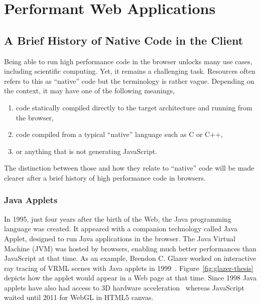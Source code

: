 \chapter{Performant Web Applications}%
\label{cha:performant_web_applications}

\minitoc%

\section{A Brief History of Native Code in the Client}%
\label{sec:native_client}

Being able to run high performance code in the browser
unlocks many use cases, including scientific computing.
Yet, it remains a challenging task.
Resources often refers to this as ``native'' code
but the terminology is rather vague.
Depending on the context, it may have one of the following meanings,
\begin{enumerate}
\setlength\itemsep{-0.5em}
	\item code statically compiled directly to the target architecture and running from the browser,
	\item code compiled from a typical ``native'' language such as C or C++,
	\item or anything that is not generating JavaScript.
\end{enumerate}
The distinction between those and how they relate to ``native'' code
will be made clearer after a brief history of high performance code in browsers.

\subsection{Java Applets}%
\label{sub:java_applets}

In 1995, just four years after the birth of the Web,
the Java programming language was created.
It appeared with a companion technology called Java Applet,
designed to run Java applications in the browser.
The Java Virtual Machine (JVM) was hosted by browsers,
enabling much better performances than JavaScript at that time.
As an example, Brendon C. Glazer worked on interactive ray tracing
of VRML scenes with Java applets in 1999~\cite{Glazer1999InteractiveRT}.
Figure~\ref{fig:glazer-thesis} depicts how the applet would appear
in a Web page at that time.
Since 1998 Java applets have also had access to 3D hardware acceleration~\cite{Java3dAPISpec}
whereas JavaScript waited until 2011 for WebGL in HTML5 canvas.

